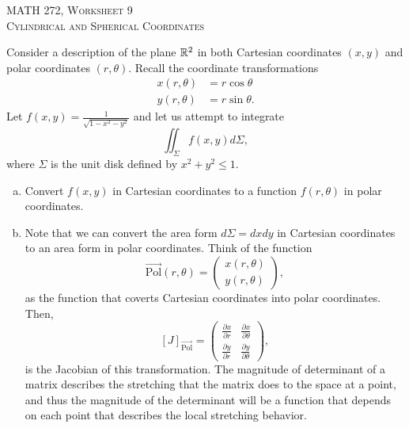 \documentclass[12pt]{article} %
\begin{document}
\begin{center}
   \textsc{\large MATH 272, Worksheet 9}\\
   \textsc{Cylindrical and Spherical Coordinates}
\end{center}
\vspace{.5cm}

\begin{problem}
    Consider a description of the plane $\mathbb{R}^2$ in both Cartesian coordinates $(x,y)$ and polar coordinates $(r,\theta)$.  Recall the coordinate transformations
    \begin{align*}
        x(r,\theta)&= r\cos \theta\\
        y(r,\theta)&= r\sin \theta.
    \end{align*}
    Let $f(x,y) = \frac{1}{\sqrt{1-x^2-y^2}}$ and let us attempt to integrate
    \[
    \iint_{\Sigma} f(x,y)d\Sigma,
    \]
    where $\Sigma$ is the unit disk defined by $x^2+y^2\leq 1$.
    \begin{enumerate}[(a)]
        \item Convert $f(x,y)$ in Cartesian coordinates to a function $f(r,\theta)$ in polar coordinates.
        \item Note that we can convert the area form $d\Sigma=dxdy$ in Cartesian coordinates to an area form in polar coordinates.  Think of the function
        \[
        \vec{\textrm{Pol}}(r,\theta) = \begin{pmatrix} x(r,\theta) \\ y(r,\theta) \end{pmatrix},
        \]
        as the function that coverts Cartesian coordinates into polar coordinates.  Then, 
        \[
        [J]_{\vec{\textrm{Pol}}} = \begin{pmatrix} \frac{\partial x}{\partial r} & \frac{\partial x}{\partial \theta} \\ \frac{\partial y}{\partial r} & \frac{\partial y}{\partial \theta} \end{pmatrix},
        \]
        is the Jacobian of this transformation. The magnitude of determinant of a matrix describes the stretching that the matrix does to the space at a point, and thus the magnitude of the determinant will be a function that depends on each point that describes the local stretching behavior.
        

\end{enumerate}
\end{problem}
\end{document}
